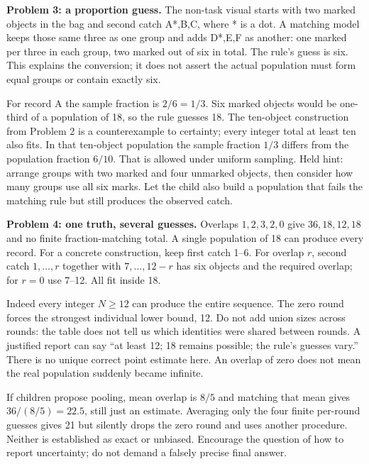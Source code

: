 \documentclass[letterpaper,11pt]{article}
\begin{document}
\textbf{Problem 3: a proportion guess.} The non-task visual starts with two marked objects in the bag and second catch A*,B,C, where * is a dot. A matching model keeps those same three as one group and adds D*,E,F as another: one marked per three in each group, two marked out of six in total. The rule's guess is six. This explains the conversion; it does not assert the actual population must form equal groups or contain exactly six.

For record A the sample fraction is $2/6=1/3$. Six marked objects would be one-third of a population of 18, so the rule guesses 18. The ten-object construction from Problem 2 is a counterexample to certainty; every integer total at least ten also fits. In that ten-object population the sample fraction $1/3$ differs from the population fraction $6/10$. That is allowed under uniform sampling. Held hint: arrange groups with two marked and four unmarked objects, then consider how many groups use all six marks. Let the child also build a population that fails the matching rule but still produces the observed catch.

\textbf{Problem 4: one truth, several guesses.} Overlaps $1,2,3,2,0$ give $36,18,12,18$ and no finite fraction-matching total. A single population of 18 can produce every record. For a concrete construction, keep first catch 1--6. For overlap $r$, second catch $1,\ldots,r$ together with $7,\ldots,12-r$ has six objects and the required overlap; for $r=0$ use 7--12. All fit inside 18.

Indeed every integer $N\ge12$ can produce the entire sequence. The zero round forces the strongest individual lower bound, 12. Do not add union sizes across rounds: the table does not tell us which identities were shared between rounds. A justified report can say ``at least 12; 18 remains possible; the rule's guesses vary.'' There is no unique correct point estimate here. An overlap of zero does not mean the real population suddenly became infinite.

If children propose pooling, mean overlap is $8/5$ and matching that mean gives $36/(8/5)=22.5$, still just an estimate. Averaging only the four finite per-round guesses gives 21 but silently drops the zero round and uses another procedure. Neither is established as exact or unbiased. Encourage the question of how to report uncertainty; do not demand a falsely precise final answer.
\end{document}
